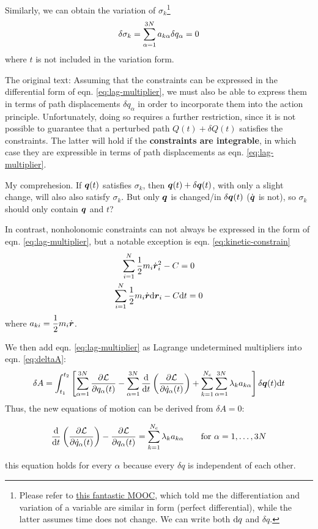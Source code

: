 Similarly, we can obtain the variation of $\sigma_k$\footnote{Please refer to \href{https://www.bilibili.com/video/BV1xJ411s78q?p=59}{this fantastic MOOC}, which told me the differentiation and variation of a variable are similar in form (perfect differential), while the latter assumes time does not change. We can write both $\mathrm{d} q$ and $\delta q$.}
\begin{equation}
	\delta\sigma_k=\sum_{\alpha=1}^{3N} a_{k\alpha}\delta q_\alpha=0
\end{equation}
where $t$ is not included in the variation form.

\mynote The original text: Assuming that the constraints can be expressed in the differential form of eqn. \ref{eq:lag-multiplier}, we must also be able to express them in terms of path displacements $\delta q_\alpha$ in order to incorporate them into the action principle. Unfortunately, doing so requires a further restriction, since it is not possible to guarantee that a perturbed path $Q(t) + \delta Q(t)$ satisfies the constraints. The latter will hold if the \textbf{constraints are integrable}, in which case they are expressible in terms of path displacements as eqn. \ref{eq:lag-multiplier}.

\supplement My comprehesion. If $\boldsymbol{q}(t)$ satisfies $\sigma_k$, then $\boldsymbol{q}(t)+\delta\boldsymbol{q}(t)$, with only a slight change, will also also satisfy $\sigma_k$. But only $\boldsymbol{q}$ is changed/in $\delta \boldsymbol{q}(t)$ ($\dot{\boldsymbol{q}}$ is not), so $\sigma_k$ should only contain $\boldsymbol{q}$ and $t$?

In contrast, nonholonomic constraints can not always be expressed in the form of eqn. \ref{eq:lag-multiplier}, but a notable exception is eqn. \ref{eq:kinetic-constrain}
\begin{gather*}
	\sum_{i=1}^N\dfrac{1}{2} m_i\dot{\boldsymbol{r}}_i^2-C=0\\
	\sum_{i=1}^N\dfrac{1}{2} m_i\dot{\boldsymbol{r}}\mathrm{d}\boldsymbol{r}_i-C\mathrm{d}t=0
\end{gather*}
where $a_{ki}=\dfrac{1}{2} m_i\dot{\boldsymbol{r}}$.

We then add eqn. \ref{eq:lag-multiplier} as Lagrange undetermined multipliers into eqn. \ref{eq:deltaA}:
\begin{equation}
	\delta A=\int_{t_1}^{t_2}\left[\sum_{\alpha=1}^{3N}\dfrac{\partial \mathcal{L}}{\partial q_\alpha(t)}-\sum_{\alpha=1}^{3N}\dfrac{\mathrm{d} }{\mathrm{d} t}\left(\dfrac{\partial \mathcal{L}}{\partial \dot{q}_\alpha(t)}\right)+\sum_{k=1}^{N_c}\sum_{\alpha=1}^{3N} \lambda_ka_{k\alpha}\right]\delta\boldsymbol{q}(t)\mathrm{d}t
\end{equation}
Thus, the new equations of motion can be derived from $\delta A=0$:
\begin{tcolorbox}
	\begin{equation}
		\dfrac{\mathrm{d} }{\mathrm{d} t}\left(\dfrac{\partial \mathcal{L}}{\partial \dot{q}_\alpha(t)}\right)-\dfrac{\partial \mathcal{L}}{\partial q_\alpha(t)}=\sum_{k=1}^{N_c}\lambda_ka_{k\alpha} \qquad \text{for}\ \alpha=1,\dots,3N
		\label{eq:motion-cons}
	\end{equation}
\end{tcolorbox}
this equation holds for every $\alpha$ because every $\delta q$ is independent of each other.

